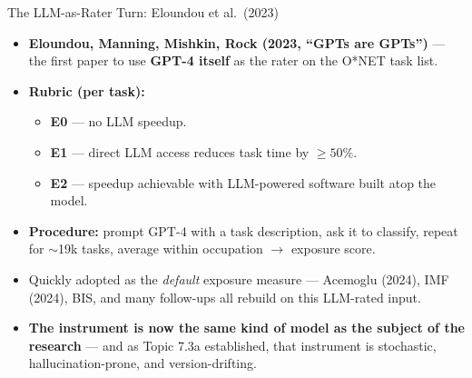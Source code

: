 \begin{frame}{The LLM-as-Rater Turn: Eloundou et al.\ (2023)}
\begin{itemize}
\item \textbf{Eloundou, Manning, Mishkin, Rock (2023, ``GPTs are GPTs'')} --- the first paper to use \textbf{GPT-4 itself} as the rater on the O*NET task list.

\medskip
\item \textbf{Rubric (per task):}
\begin{itemize}
\item \textbf{E0} --- no LLM speedup.
\item \textbf{E1} --- direct LLM access reduces task time by $\ge 50\%$.
\item \textbf{E2} --- speedup achievable with LLM-powered software built atop the model.
\end{itemize}

\medskip
\item \textbf{Procedure:} prompt GPT-4 with a task description, ask it to classify, repeat for $\sim$19k tasks, average within occupation $\to$ exposure score.

\medskip
\item Quickly adopted as the \emph{default} exposure measure --- Acemoglu (2024), IMF (2024), BIS, and many follow-ups all rebuild on this LLM-rated input.

\medskip
\item \textbf{The instrument is now the same kind of model as the subject of the research} --- and as Topic 7.3a established, that instrument is stochastic, hallucination-prone, and version-drifting.
\end{itemize}
\end{frame}


